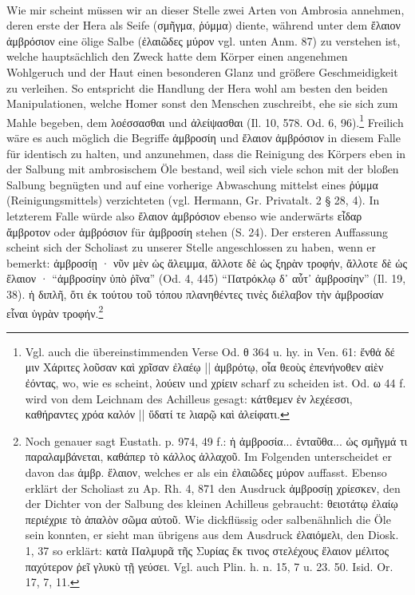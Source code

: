 \documentclass[a4paper, 11pt, oneside]{article}
\begin{document}
\paragraph{}
Wie mir scheint müssen wir an dieser Stelle zwei Arten von Ambrosia annehmen, deren erste der Hera als Seife (σμῆγμα, ῥύμμα) diente, während unter dem ἔλαιον ἀμβρόσιον eine ölige Salbe (ἐλαιῶδες μύρον vgl. unten Anm. 87) zu verstehen ist, welche hauptsächlich den Zweck hatte dem Körper einen angenehmen Wohlgeruch und der Haut einen besonderen Glanz und größere Geschmeidigkeit zu verleihen. So entspricht die Handlung der Hera wohl am besten den beiden Manipulationen, welche Homer sonst den Menschen zuschreibt, ehe sie sich zum Mahle begeben, dem λοέσσασθαι und ἀλείψασθαι (Il. 10, 578. Od. 6, 96).\footnote{Vgl. auch die übereinstimmenden Verse Od. θ 364 u. hy. in Ven. 61: ἔνθἁ δέ μιν Χάριτες λοῦσαν καὶ χρῖσαν ἐλαέῳ || ἀμβρότῳ, οἷα θεοὺς ἐπενήνοθεν αἰὲν ἐόντας, wo, wie es scheint, λούειν und χρίειν scharf zu scheiden ist. Od. ω 44 f. wird von dem Leichnam des Achilleus gesagt: κάτθεμεν ἐν λεχέεσσι, καθήραντες χρόα καλόν || ὕδατί τε λιαρῷ καὶ ἀλείφατι.} Freilich wäre es auch möglich die Begriffe ἀμβροσίη und ἔλαιον ἀμβρόσιον in diesem Falle für identisch zu halten, und anzunehmen, dass die Reinigung des Körpers eben in der Salbung mit ambrosischem Öle bestand, weil sich viele schon mit der bloßen Salbung begnügten und auf eine vorherige Abwaschung mittelst eines ῥύμμα (Reinigungsmittels) verzichteten (vgl. Hermann, Gr. Privatalt. 2 § 28, 4). In letzterem Falle würde also ἔλαιον ἀμβρόσιον ebenso wie anderwärts εἶδαρ ἄμβροτον oder ἀμβρόσιον für ἀμβροσίη stehen (S. 24). Der ersteren Auffassung scheint sich der Scholiast zu unserer Stelle angeschlossen zu haben, wenn er bemerkt: ἀμβροσίῃ · νῦν μὲν ὡς ἄλειμμα, ἄλλοτε δὲ ὡς ξηρὰν τροφήν, ἄλλοτε δὲ ὡς ἔλαιον · "`ἀμβροσίην ὑπὸ ῥῖνα"' (Od. 4, 445) "`Πατρόκλῳ δ᾽ αὖτ᾽ ἀμβροσίην"' (Il. 19, 38). ἡ διπλῆ, ὅτι ἐκ τούτου τοῦ τόπου πλανηθέντες τινὲς διέλαβον τὴν ἀμβροσίαν εἷναι ὑγρὰν τροφήν.\footnote{Noch genauer sagt Eustath. p. 974, 49 f.: ἡ ἀμβροσία... ἐνταῦθα... ὡς σμῆγμά τι παραλαμβάνεται, καθάπερ τὸ κάλλος ἀλλαχοῦ. Im Folgenden unterscheidet er davon das ἀμβρ. ἔλαιον, welches er als ein ἐλαιῶδες μύρον auffasst. Ebenso erklärt der Scholiast zu Ap. Rh. 4, 871 den Ausdruck ἀμβροσίῃ χρίεσκεν, den der Dichter von der Salbung des kleinen Achilleus gebraucht: θειοτάτῳ ἐλαίῳ περιέχριε τὸ ἁπαλὸν σῶμα αὐτοῦ. Wie dickflüssig oder salbenähnlich die Öle sein konnten, er sieht man übrigens aus dem Ausdruck ἐλαιόμελι, den Diosk. 1, 37 so erklärt: κατὰ Παλμυρᾶ τῆς Συρίας ἔκ τινος στελέχους ἔλαιον μέλιτος παχύτερον ῥεῖ γλυκὺ τῇ γεύσει. Vgl. auch Plin. h. n. 15, 7 u. 23. 50. Isid. Or. 17, 7, 11.}
\end{document}

